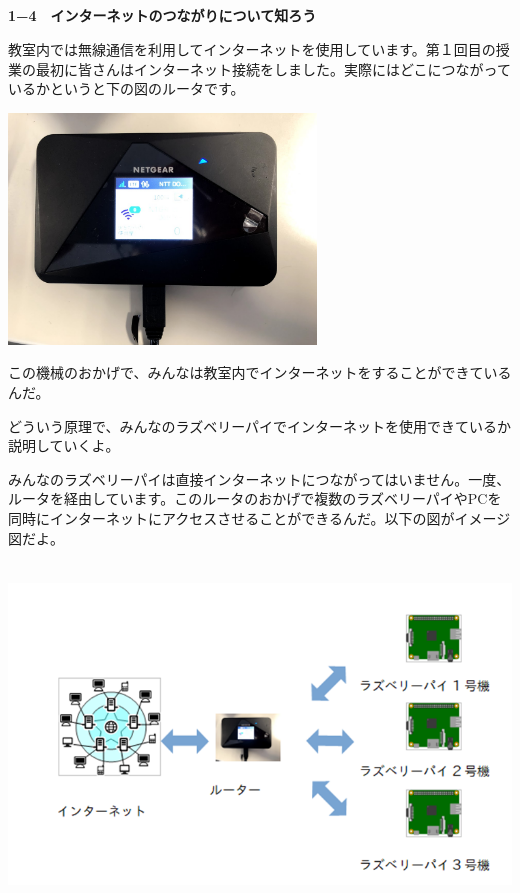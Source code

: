 \documentclass[a4paper,12pt,dvipdfmx]{jarticle}
\begin{document}
\flushleft


\subsection*{\bfseries }
\clearpage
\textbf{1−4　インターネットのつながりについて知ろう}

教室内では無線通信を利用してインターネットを使用しています。第１回目の授業の最初に皆さんはインターネット接続をしました。実際にはどこにつながっているかというと下の図のルータです。

\centering
\includegraphics[width=8.186cm,height=6.142cm]{ome7-img011.png}
\flushleft


\bigskip


\bigskip


\bigskip


\bigskip


\bigskip


\bigskip


\bigskip


\bigskip

この機械のおかげで、みんなは教室内でインターネットをすることができているんだ。

どういう原理で、みんなのラズベリーパイでインターネットを使用できているか説明していくよ。

みんなのラズベリーパイは直接インターネットにつながってはいません。一度、ルータを経由しています。このルータのおかげで複数のラズベリーパイやPCを同時にインターネットにアクセスさせることができるんだ。以下の図がイメージ図だよ。


\bigskip



\centering
\includegraphics[width=15.214cm,height=9.11cm]{ome7-img012.png}
\flushleft
\end{document}
